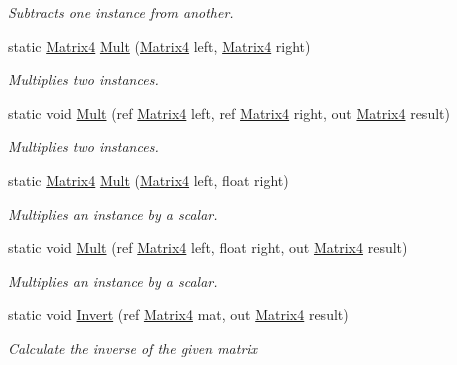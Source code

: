 \begin{DoxyCompactItemize}
\begin{DoxyCompactList}\small\item\em Subtracts one instance from another. \end{DoxyCompactList}\item 
static \hyperlink{struct_open_t_k_1_1_matrix4}{Matrix4} \hyperlink{struct_open_t_k_1_1_matrix4_aa1c9d1ad57f29ee6d4283c9443619599}{Mult} (\hyperlink{struct_open_t_k_1_1_matrix4}{Matrix4} left, \hyperlink{struct_open_t_k_1_1_matrix4}{Matrix4} right)
\begin{DoxyCompactList}\small\item\em Multiplies two instances. \end{DoxyCompactList}\item 
static void \hyperlink{struct_open_t_k_1_1_matrix4_a61f937b8f1944f375f73b7dcc0d94e52}{Mult} (ref \hyperlink{struct_open_t_k_1_1_matrix4}{Matrix4} left, ref \hyperlink{struct_open_t_k_1_1_matrix4}{Matrix4} right, out \hyperlink{struct_open_t_k_1_1_matrix4}{Matrix4} result)
\begin{DoxyCompactList}\small\item\em Multiplies two instances. \end{DoxyCompactList}\item 
static \hyperlink{struct_open_t_k_1_1_matrix4}{Matrix4} \hyperlink{struct_open_t_k_1_1_matrix4_a85f4f72693fc856fbde7e3e5236c3d50}{Mult} (\hyperlink{struct_open_t_k_1_1_matrix4}{Matrix4} left, float right)
\begin{DoxyCompactList}\small\item\em Multiplies an instance by a scalar. \end{DoxyCompactList}\item 
static void \hyperlink{struct_open_t_k_1_1_matrix4_aea5096ba8a9ee0b35d9c37c29faf8637}{Mult} (ref \hyperlink{struct_open_t_k_1_1_matrix4}{Matrix4} left, float right, out \hyperlink{struct_open_t_k_1_1_matrix4}{Matrix4} result)
\begin{DoxyCompactList}\small\item\em Multiplies an instance by a scalar. \end{DoxyCompactList}\item 
static void \hyperlink{struct_open_t_k_1_1_matrix4_a56a031039ffc581dcb48c8a71102ac21}{Invert} (ref \hyperlink{struct_open_t_k_1_1_matrix4}{Matrix4} mat, out \hyperlink{struct_open_t_k_1_1_matrix4}{Matrix4} result)
\begin{DoxyCompactList}\small\item\em Calculate the inverse of the given matrix \end{DoxyCompactList}\item 

\end{DoxyCompactItemize}
